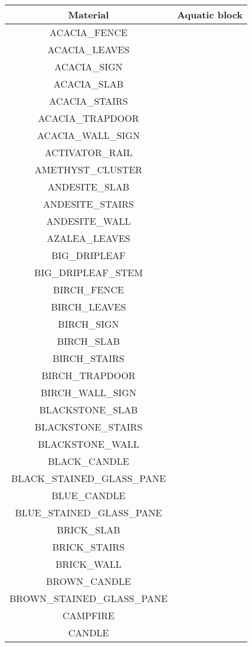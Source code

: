 \begin{longtable}{ |c|c| }
	\hline
	Material & Aquatic block\footnotemark \\
	\hline
	\endhead
	ACACIA\_FENCE & \xmark \\
	ACACIA\_LEAVES & \xmark \\
	ACACIA\_SIGN & \xmark \\
	ACACIA\_SLAB & \xmark \\
	ACACIA\_STAIRS & \xmark \\
	ACACIA\_TRAPDOOR & \xmark \\
	ACACIA\_WALL\_SIGN & \xmark \\
	ACTIVATOR\_RAIL & \xmark \\
	AMETHYST\_CLUSTER & \xmark \\
	ANDESITE\_SLAB & \xmark \\
	ANDESITE\_STAIRS & \xmark \\
	ANDESITE\_WALL & \xmark \\
	AZALEA\_LEAVES & \xmark \\
	BIG\_DRIPLEAF & \xmark \\
	BIG\_DRIPLEAF\_STEM & \xmark \\
	BIRCH\_FENCE & \xmark \\
	BIRCH\_LEAVES & \xmark \\
	BIRCH\_SIGN & \xmark \\
	BIRCH\_SLAB & \xmark \\
	BIRCH\_STAIRS & \xmark \\
	BIRCH\_TRAPDOOR & \xmark \\
	BIRCH\_WALL\_SIGN & \xmark \\
	BLACKSTONE\_SLAB & \xmark \\
	BLACKSTONE\_STAIRS & \xmark \\
	BLACKSTONE\_WALL & \xmark \\
	BLACK\_CANDLE & \xmark \\
	BLACK\_STAINED\_GLASS\_PANE & \xmark \\
	BLUE\_CANDLE & \xmark \\
	BLUE\_STAINED\_GLASS\_PANE & \xmark \\
	BRICK\_SLAB & \xmark \\
	BRICK\_STAIRS & \xmark \\
	BRICK\_WALL & \xmark \\
	BROWN\_CANDLE & \xmark \\
	BROWN\_STAINED\_GLASS\_PANE & \xmark \\
	CAMPFIRE & \xmark \\
	CANDLE & \xmark \\

\end{longtable}
